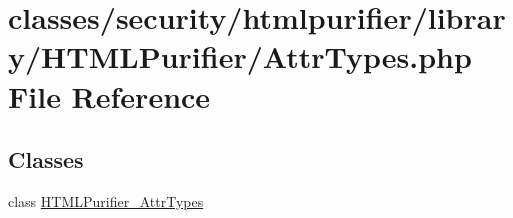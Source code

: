\hypertarget{AttrTypes_8php}{\section{classes/security/htmlpurifier/library/\+H\+T\+M\+L\+Purifier/\+Attr\+Types.php File Reference}
\label{AttrTypes_8php}
}
\subsection*{Classes}
\begin{DoxyCompactItemize}
\item 
class \hyperlink{classHTMLPurifier__AttrTypes}{H\+T\+M\+L\+Purifier\+\_\+\+Attr\+Types}
\end{DoxyCompactItemize}
